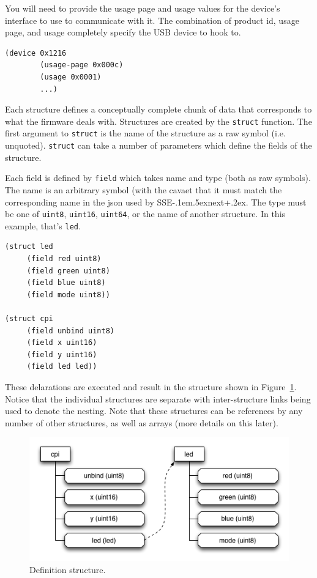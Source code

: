 \documentclass[12pt]{article}
\def\SSEnext{SSE\kern-.1em\lower.5ex\hbox{\footnotesize next}\kern+.2ex}
\def\SSEnext{SSE\kern-.1em\lower.5ex\hbox{\footnotesize next}\kern+.2ex}
\begin{document}
You will need to provide the usage page and usage values for the
device's interface to use to communicate with it. The combination of
product id, usage page, and usage completely specify the USB device to
hook to.

\begin{verbatim}
(device 0x1216
        (usage-page 0x000c)
        (usage 0x0001)
        ...)
\end{verbatim}

Each structure defines a conceptually complete chunk of data that
corresponds to what the firmware deals with.  Structures are created
by the \verb|struct| function. The first argument to
\verb|struct| is the name of the structure as a raw symbol (i.e.
unquoted). \verb|struct| can take a number of parameters which
define the fields of the structure.

Each field is defined by \verb|field| which takes name and type
(both as raw symbols). The name is an arbitrary symbol (with the
cavaet that it must match the corresponding name in the json used by
\SSEnext. The type must be one of \verb|uint8|, \verb|uint16|,
\verb|uint64|, or the name of another structure. In this example,
that's \verb|led|.

\begin{verbatim}
(struct led
     (field red uint8)
     (field green uint8)
     (field blue uint8)
     (field mode uint8))

(struct cpi
     (field unbind uint8)
     (field x uint16)
     (field y uint16)
     (field led led))
\end{verbatim}

These delarations are executed and result in the structure shown in
Figure~\ref{fig:defstructure}. Notice that the individual structures
are separate with inter-structure links being used to denote the
nesting. Note that these structures can be references by any number of
other structures, as well as arrays (more details on this later).

\begin{figure}[htbp] %
   \centering
   \includegraphics[width=5in]{def_structure.png} 
\caption{Definition structure.}
\label{fig:defstructure}
\end{figure}
\end{document}
